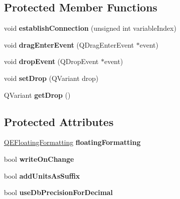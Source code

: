 \subsection*{Protected Member Functions}
\begin{DoxyCompactItemize}
\item 
\hypertarget{classQESpinBox_abf45dfc5de5b6e34f5b9f5dab4cbd8ce}{
void {\bfseries establishConnection} (unsigned int variableIndex)}
\label{classQESpinBox_abf45dfc5de5b6e34f5b9f5dab4cbd8ce}

\item 
\hypertarget{classQESpinBox_a8164d9eda6ca0a82a3bca2eccc65a4b3}{
void {\bfseries dragEnterEvent} (QDragEnterEvent $\ast$event)}
\label{classQESpinBox_a8164d9eda6ca0a82a3bca2eccc65a4b3}

\item 
\hypertarget{classQESpinBox_a11ca9a9d66988cc51b22a9d609b37020}{
void {\bfseries dropEvent} (QDropEvent $\ast$event)}
\label{classQESpinBox_a11ca9a9d66988cc51b22a9d609b37020}

\item 
\hypertarget{classQESpinBox_ac504fc4968e8c0179ae260d52893d5d3}{
void {\bfseries setDrop} (QVariant drop)}
\label{classQESpinBox_ac504fc4968e8c0179ae260d52893d5d3}

\item 
\hypertarget{classQESpinBox_a6166167938e2b5220b543eeb66856822}{
QVariant {\bfseries getDrop} ()}
\label{classQESpinBox_a6166167938e2b5220b543eeb66856822}

\end{DoxyCompactItemize}
\subsection*{Protected Attributes}
\begin{DoxyCompactItemize}
\item 
\hypertarget{classQESpinBox_a3cd8700638c3f4adda296ec0e2f69ba8}{
\hyperlink{classQEFloatingFormatting}{QEFloatingFormatting} {\bfseries floatingFormatting}}
\label{classQESpinBox_a3cd8700638c3f4adda296ec0e2f69ba8}

\item 
\hypertarget{classQESpinBox_a8d6c034b5abcaaed0762dce719e5bc29}{
bool {\bfseries writeOnChange}}
\label{classQESpinBox_a8d6c034b5abcaaed0762dce719e5bc29}

\item 
\hypertarget{classQESpinBox_a16e49bf4e5cd9e1e6894b8755bd27015}{
bool {\bfseries addUnitsAsSuffix}}
\label{classQESpinBox_a16e49bf4e5cd9e1e6894b8755bd27015}

\item 
\hypertarget{classQESpinBox_ac4be8cf4445a98bd213576ce2358e452}{
bool {\bfseries useDbPrecisionForDecimal}}
\label{classQESpinBox_ac4be8cf4445a98bd213576ce2358e452}

\end{DoxyCompactItemize}
